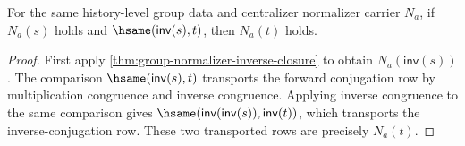 \begin{theorem}
\label{thm:group-normalizer-inverse-hsame-transport}
For the same history-level group data and centralizer normalizer carrier $N_a$,
if $N_a(s)$ holds and $\hsame(\mathsf{inv}(s),t)$, then $N_a(t)$ holds.
\end{theorem}
\begin{proof}
First apply \autoref{thm:group-normalizer-inverse-closure} to obtain
$N_a(\mathsf{inv}(s))$. The comparison
$\hsame(\mathsf{inv}(s),t)$ transports the forward conjugation row by
multiplication congruence and inverse congruence. Applying inverse congruence to
the same comparison gives
$\hsame(\mathsf{inv}(\mathsf{inv}(s)),\mathsf{inv}(t))$, which transports the
inverse-conjugation row. These two transported rows are precisely $N_a(t)$.
\end{proof}

